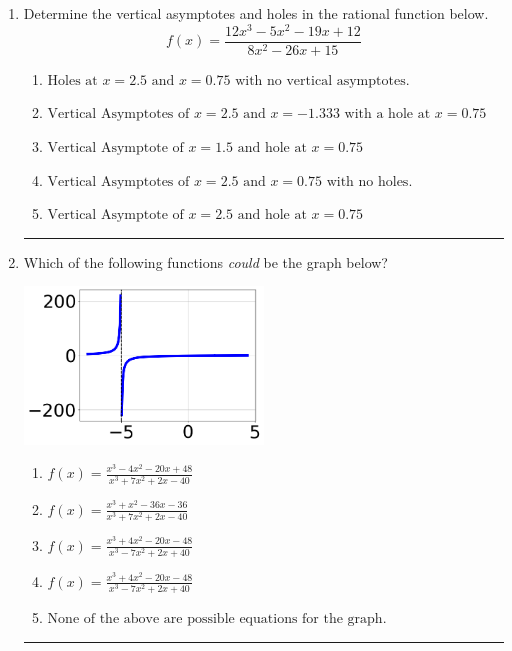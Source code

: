 \documentclass[14pt]{extbook}
\newcommand{\litem}[1]{\item#1\hspace*{-1cm}\rule{\textwidth}{0.4pt}}
\begin{document}
\begin{enumerate}
{\begin{enumerate}[label=\Alph*.]
\end{enumerate} }
\litem{
Determine the vertical asymptotes and holes in the rational function below.\[ f(x) = \frac{12x^{3} -5 x^{2} -19 x + 12}{8x^{2} -26 x + 15} \]\begin{enumerate}[label=\Alph*.]
\item \( \text{Holes at } x = 2.5 \text{ and } x = 0.75 \text{ with no vertical asymptotes.} \)
\item \( \text{Vertical Asymptotes of } x = 2.5 \text{ and } x = -1.333 \text{ with a hole at } x = 0.75 \)
\item \( \text{Vertical Asymptote of } x = 1.5 \text{ and hole at } x = 0.75 \)
\item \( \text{Vertical Asymptotes of } x = 2.5 \text{ and } x = 0.75 \text{ with no holes.} \)
\item \( \text{Vertical Asymptote of } x = 2.5 \text{ and hole at } x = 0.75 \)

\end{enumerate} }
\litem{
Which of the following functions \textit{could} be the graph below?
\begin{center}
    \includegraphics[width=0.5\textwidth]{../Figures/identifyGraphOfRationalFunctionCopyC.png}
\end{center}
\begin{enumerate}[label=\Alph*.]
\item \( f(x)=\frac{x^{3} -4 x^{2} -20 x + 48}{x^{3} +7 x^{2} +2 x -40} \)
\item \( f(x)=\frac{x^{3} + x^{2} -36 x -36}{x^{3} +7 x^{2} +2 x -40} \)
\item \( f(x)=\frac{x^{3} +4 x^{2} -20 x -48}{x^{3} -7 x^{2} +2 x + 40} \)
\item \( f(x)=\frac{x^{3} +4 x^{2} -20 x -48}{x^{3} -7 x^{2} +2 x + 40} \)
\item \( \text{None of the above are possible equations for the graph.} \)

\end{enumerate} }
\end{enumerate}
\end{document}
